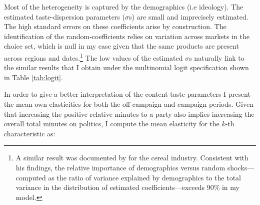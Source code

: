 \documentclass[12pt]{article}
\begin{document}
Most of the heterogeneity is captured by the demographics (i.e ideology).  The estimated taste-dispersion parameters (\(\sigma\)s) are small and imprecisely estimated. The high standard errors on these coefficients arise by construction. The identification of the random-coefficients  relies on variation across markets in the choice set, which is null in my case given that the same products are present across regions and dates.\footnote{A similar result was documented by \citet{Nevo1998MeasuringMP} for the cereal industry. Consistent with his findings, the relative importance of demographics versus random shocks—computed as the ratio of variance explained by demographics to the total variance in the distribution of estimated coefficients—exceeds 90\% in my model.} The low values of the  estimated $\sigma$s naturally link to the similar results that I obtain under the multinomial logit specification shown in Table \ref{tab:logit}. 
 
  In order to give a better interpretation of the content-taste parameters I present the mean own elasticities for both the off-campaign and campaign periods.   Given that increasing the positive relative minutes to a party also implies increasing the overall total minutes on politics, I compute the mean elasticity for the $k$-th characteristic as: 

\end{document}
